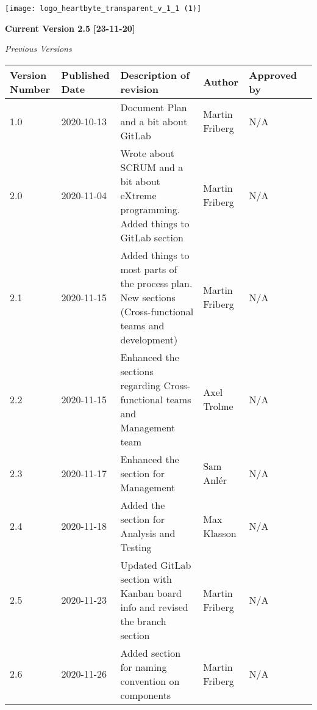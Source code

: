 \maketitle
\setlength{\parskip}{0em}

\begin{center}

      \vfill
\texttt{[image: logo\_heartbyte\_transparent\_v\_1\_1 (1)]}

    \vfill
\clearpage


    \textbf{\large Current Version 2.5 [23-11-20]}
    \vspace{10mm}
    
    \emph{\large Previous Versions}
    
\begin{center}
\begin{tabular}{ | m{5em} | m{5em}| m{10em} |m{5em}| m{5em} |m{5em} |  } 
\hline
Version Number& Published Date & Description of revision & Author & Approved by \\ 
\hline
1.0 & 2020-10-13 & Document Plan and a bit about GitLab & Martin Friberg & N/A \\
\hline
2.0 & 2020-11-04 & Wrote about SCRUM and a bit about eXtreme programming. Added things to GitLab section & Martin Friberg & N/A \\ 
\hline
2.1 & 2020-11-15 & Added things to most parts of the process plan. New sections (Cross-functional teams and development) & Martin Friberg & N/A \\
\hline
2.2 & 2020-11-15 & Enhanced the sections regarding Cross-functional teams and Management team & Axel Trolme & N/A \\
\hline
2.3 & 2020-11-17 & Enhanced the section for Management & Sam Anlér & N/A \\
\hline
2.4 & 2020-11-18 & Added the section for Analysis and Testing & Max Klasson & N/A \\
\hline
2.5 & 2020-11-23 & Updated GitLab section with Kanban board info and revised the branch section & Martin Friberg & N/A \\
\hline
2.6 & 2020-11-26 & Added section for naming convention on components & Martin Friberg & N/A \\
\hline
\end{tabular}
\end{center}

\end{center}

\clearpage
    {
 
        \renewcommand{\contentsname}{Innehåll}
        \tableofcontents
    }
    
\clearpage
